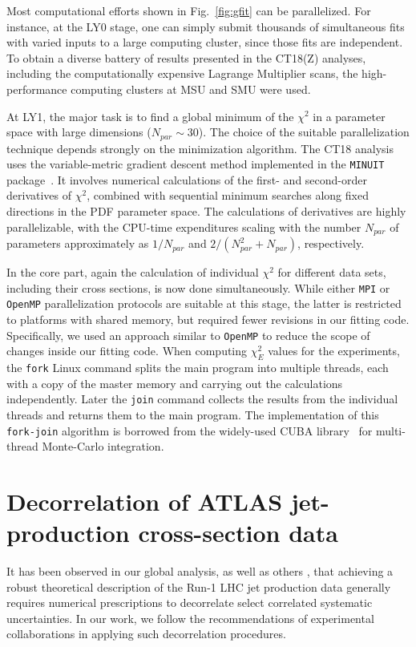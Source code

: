 %
Most computational efforts shown in Fig.~\ref{fig:gfit} can be parallelized.
For instance, at the LY0 stage, one can simply submit thousands of simultaneous fits with varied inputs to a large computing cluster, since those fits are
independent. To obtain a diverse battery of results presented in the CT18(Z) analyses, including the computationally expensive Lagrange Multiplier scans, the high-performance computing clusters at MSU and SMU were used. 

%
At LY1, the major task is to find a global minimum of the $\chi^2$ in a parameter space with large dimensions ($N_{par}\sim 30$).
The choice of the suitable parallelization technique depends strongly on the minimization algorithm.
%
The CT18 analysis uses the variable-metric gradient descent method implemented in the \texttt{MINUIT} package~\cite{James:2004xla}.
%
It involves numerical calculations of the first- and 
second-order derivatives of $\chi^2$, combined with sequential minimum searches along fixed directions
in the PDF parameter space.
%
The calculations of derivatives are highly parallelizable, with the CPU-time expenditures scaling with the number $N_{par}$ of parameters approximately as
$1/N_\mathit{par}$ and $2/(N^2_\mathit{par}\!+\!N_\mathit{par})$, respectively.

%
In the core part, again the calculation of individual $\chi^2$ for different data sets, including their cross sections, is now done simultaneously.
While either \texttt{MPI} or \texttt{OpenMP} parallelization protocols are suitable at this stage,
the latter is restricted to platforms with shared memory, but required fewer revisions in our fitting code.
%
Specifically, we used an approach similar to \texttt{OpenMP} to reduce the scope of changes inside
our fitting code.
%
When computing $\chi^2_E$ values for the experiments, the \verb|fork| Linux command splits the main program into multiple threads,
each with a copy of the master memory and carrying out the calculations independently.
%
Later the \verb|join| command collects the  results from the individual threads and returns them to
the main program.
%
The implementation of this \verb|fork-join| algorithm is borrowed from the widely-used
CUBA library~\cite{Hahn:2004fe} for multi-thread Monte-Carlo integration.   

\section{Decorrelation of ATLAS jet-production cross-section data}
\label{sec:ATLASjetdecorrel}
%
%
It has been observed in our global analysis, as well as others \cite{Harland-Lang:2017ytb}, that achieving a robust theoretical description of the Run-1 LHC jet production data generally requires numerical prescriptions to decorrelate select correlated systematic uncertainties. In our work, we follow the recommendations of experimental collaborations in applying such decorrelation procedures.


